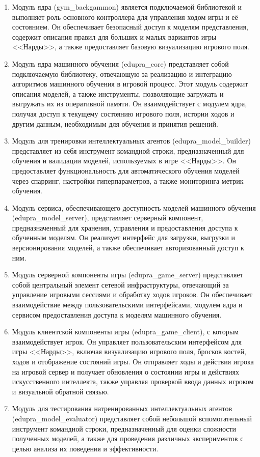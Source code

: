 \begin{enumerate}
    \item Модуль ядра (gym\_backgammon) является подключаемой библиотекой и выполняет роль основного контроллера для управления ходом игры и её состоянием. Он обеспечивает безопасный доступ к моделям представления, содержит описания правил для больших и малых вариантов игры <<Нарды>>, а также предоставляет базовую визуализацию игрового поля.
    \item Модуль ядра машинного обучения (edupra\_core) представляет собой подключаемую библиотеку, отвечающую за реализацию и интеграцию алгоритмов машинного обучения в игровой процесс. Этот модуль содержит описания моделей, а также инструменты, позволяющие загружать и выгружать их из оперативной памяти. Он взаимодействует с модулем ядра, получая доступ к текущему состоянию игрового поля, истории ходов и другим данным, необходимым для обучения и принятия решений.
    \item Модуль для тренировки интеллектуальных агентов (edupra\_model\_builder) представляет из себя инструмент командной строки, предназначенный для обучения и валидации моделей, используемых в игре <<Нарды>>. Он предоставляет функциональность для автоматического обучения моделей через спарринг, настройки гиперпараметров, а также мониторинга метрик обучения.
    \item Модуль сервиса, обеспечивающего доступность моделей машинного обучения (edupra\_model\_server), представляет серверный компонент, предназначенный для хранения, управления и предоставления доступа к обученным моделям. Он реализует интерфейс для загрузки, выгрузки и версионирования моделей, а также обеспечивает авторизованный доступ к ним.
    \item Модуль серверной компоненты игры (edupra\_game\_server) представляет собой центральный элемент сетевой инфраструктуры, отвечающий за управление игровыми сессиями и обработку ходов игроков. Он обеспечивает взаимодействие между пользовательскими интерфейсами, модулем ядра и сервисом предоставления доступа к моделям машинного обучения.
    \item Модуль клиентской компоненты игры (edupra\_game\_client), с которым взаимодействует игрок. Он управляет пользовательским интерфейсом для игры <<Нарды>>, включая визуализацию игрового поля, бросков костей, ходов и отображение состояний игры. Он отправляет ходы и действия игрока на игровой сервер и получает обновления о состоянии игры и действиях искусственного интеллекта, также управляя проверкой ввода данных игроком и визуальной обратной связью.
    \item Модуль для тестирования натренированных интеллектуальных агентов (edupra\_model\_evaluator) представляет собой небольшой вспомогательный инструмент командной строки, предназначенный для оценки сложности полученных моделей, а также для проведения различных экспериментов с целью анализа их поведения и эффективности.
\end{enumerate}
